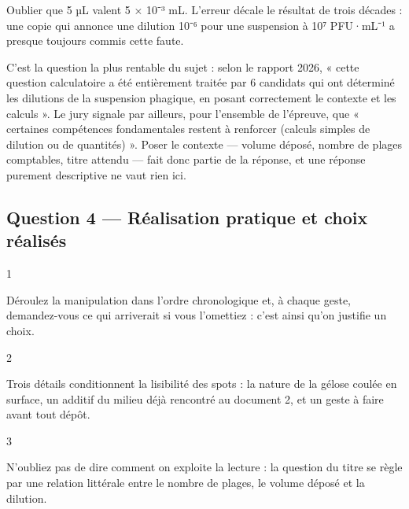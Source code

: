 \documentclass[11pt,a4paper]{article}
\begin{document}
\begin{piege}

Oublier que 5 µL valent 5 × 10⁻³ mL. L'erreur décale le résultat de trois décades : une copie qui annonce une dilution 10⁻⁶ pour une suspension à 10⁷ PFU·mL⁻¹ a presque toujours commis cette faute.

\end{piege}

\begin{jury}

C'est la question la plus rentable du sujet : selon le rapport 2026, « cette question calculatoire a été entièrement traitée par 6 candidats qui ont déterminé les dilutions de la suspension phagique, en posant correctement le contexte et les calculs ». Le jury signale par ailleurs, pour l'ensemble de l'épreuve, que « certaines compétences fondamentales restent à renforcer (calculs simples de dilution ou de quantités) ». Poser le contexte --- volume déposé, nombre de plages comptables, titre attendu --- fait donc partie de la réponse, et une réponse purement descriptive ne vaut rien ici.

\end{jury}

\hypertarget{question-4-ruxe9alisation-pratique-et-choix-ruxe9alisuxe9s}{%
\subsection{Question 4 --- Réalisation pratique et choix réalisés}\label{question-4-ruxe9alisation-pratique-et-choix-ruxe9alisuxe9s}}

\begin{indication}{1}

Déroulez la manipulation dans l'ordre chronologique et, à chaque geste, demandez-vous ce qui arriverait si vous l'omettiez : c'est ainsi qu'on justifie un choix.

\end{indication}

\begin{indication}{2}

Trois détails conditionnent la lisibilité des spots : la nature de la gélose coulée en surface, un additif du milieu déjà rencontré au document 2, et un geste à faire avant tout dépôt.

\end{indication}

\begin{indication}{3}

N'oubliez pas de dire comment on exploite la lecture : la question du titre se règle par une relation littérale entre le nombre de plages, le volume déposé et la dilution.

\end{indication}
\end{document}
